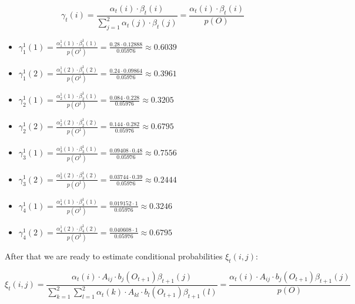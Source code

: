 \documentclass[11pt,a4paper]{article}
\begin{document}
	$$  \gamma_t(i) = \frac{\alpha_t(i) \cdot \beta_t(i)}{\sum_{j = 1}^2 \alpha_t(j) \cdot \beta_t(j)} = \frac{\alpha_t(i) \cdot \beta_t(i)}{p(O)} $$
	\begin{itemize}
		\item $\gamma_1^1(1) = \frac{\alpha_1^1(1) \cdot \beta_1^1(1)}{p(O^1)} =  \frac{0.28 \cdot 0.12888}{0.05976} \approx 0.6039$
		\item $\gamma_1^1(2) = \frac{\alpha_1^1(2) \cdot \beta_1^1(2)}{p(O^1)} =  \frac{0.24 \cdot 0.09864}{0.05976} \approx 0.3961$
		\item $\gamma_2^1(1) = \frac{\alpha_2^1(1) \cdot \beta_2^1(1)}{p(O^1)} =  \frac{0.084 \cdot 0.228}{0.05976} \approx 0.3205$
		\item $\gamma_2^1(2) = \frac{\alpha_2^1(2) \cdot \beta_2^1(2)}{p(O^1)} =  \frac{0.144 \cdot 0.282}{0.05976} \approx 0.6795$
		\item $\gamma_3^1(1) = \frac{\alpha_3^1(1) \cdot \beta_3^1(1)}{p(O^1)} =  \frac{0.09408 \cdot 0.48}{0.05976} \approx 0.7556$
		\item $\gamma_3^1(2) = \frac{\alpha_3^1(2) \cdot \beta_3^1(2)}{p(O^1)} =  \frac{0.03744 \cdot 0.39}{0.05976} \approx 0.2444$
		\item $\gamma_4^1(1) = \frac{\alpha_4^1(1) \cdot \beta_4^1(1)}{p(O^1)} =  \frac{0.019152 \cdot 1}{0.05976} \approx 0.3246$
		\item $\gamma_4^1(2) = \frac{\alpha_4^1(2) \cdot \beta_4^1(2)}{p(O^1)} =  \frac{0.040608 \cdot 1}{0.05976} \approx 0.6795$
	\end{itemize}
	
	
	After that we are ready to estimate conditional probabilities $\xi_t(i, j)$:
	
	$$ \xi_t(i, j) = \frac{\alpha_t(i) \cdot A_{ij} \cdot b_j(O_{t+1}) \beta_{t+1}(j)}{\sum_{k = 1}^2 \sum_{l = 1}^2\alpha_t(k) \cdot A_{kl} \cdot b_l(O_{t+1}) \beta_{t+1}(l)} = \frac{\alpha_t(i) \cdot A_{ij} \cdot b_j(O_{t+1}) \beta_{t+1}(j)}{p(O)} $$
	
\end{document}
